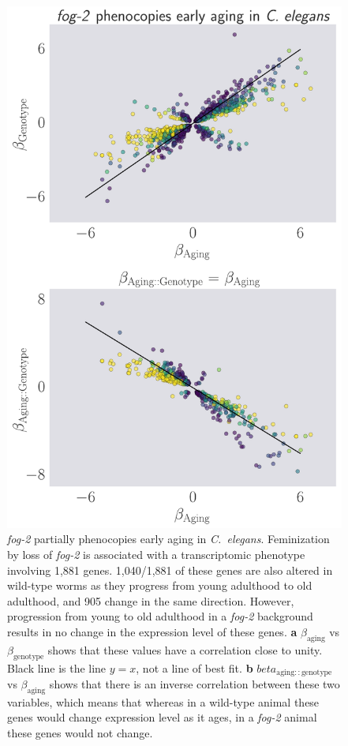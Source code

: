 \documentclass[9pt,twocolumn,twoside]{gsag3jnl}
\newcommand{\cel}{\emph{C.~elegans}}
\newcommand{\fog}{\emph{fog-2}}
\newcommand{\fogn}{1,881}
\newcommand{\coexpressed}{905}
\newcommand{\intersectn}{1,040}
\begin{document}
\begin{figure}[htbp]
\renewcommand{\familydefault}{\sfdefault}\normalfont{}
\centering
\includegraphics[width=\linewidth]{../output/figs/final_figs/aberrant_aging.pdf}
\caption{ \fog{} partially phenocopies early aging in \cel{}. Feminization by loss of \fog{} is associated with a transcriptomic phenotype involving \fogn{} genes. \intersectn{}/\fogn{} of these genes are also altered in wild-type worms as they progress from young adulthood to old adulthood, and \coexpressed{} change in the same direction. However, progression from young to old adulthood in a \fog{} background results in no change in the expression level of these genes. \textbf{a} $\beta_\mathrm{aging}$ vs $\beta_\mathrm{genotype}$ shows that these values have a correlation close to unity. Black line is the line $y=x$, not a line of best fit. \textbf{b} $beta_\mathrm{aging::genotype}$ vs $\beta_\mathrm{aging}$ shows that there is an inverse correlation between these two variables, which means that whereas in a wild-type animal these genes would change expression level as it ages, in a \fog{} animal these genes would not change.
}
\end{figure}
\end{document}
